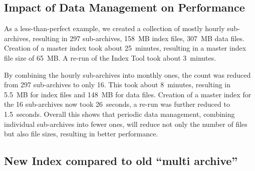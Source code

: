 \subsection{Impact of Data Management on Performance}
As a less-than-perfect example, we created a collection of mostly
hourly sub-archives, resulting in 297 sub-archives, 158~MB index
files, 307~MB data files.  Creation of a master index took about
25~minutes, resulting in a master index file size of 65~MB.  A re-run
of the Index Tool took about 3~minutes.

By combining the hourly sub-archives into monthly ones, the count was
reduced from 297 sub-archives to only 16.  This took about
8~minutes, resulting in 5.5~MB for index files and 148~MB for data
files. Creation of a master index for the 16 sub-archives now took
26~seconds, a re-run was further reduced to 1.5~seconds.
Overall this shows that periodic data management, combining individual
sub-archives into fewer ones, will reduce not only the number of files
but also file sizes, resulting in better performance.

\subsection{New Index compared to old ``multi archive''}


